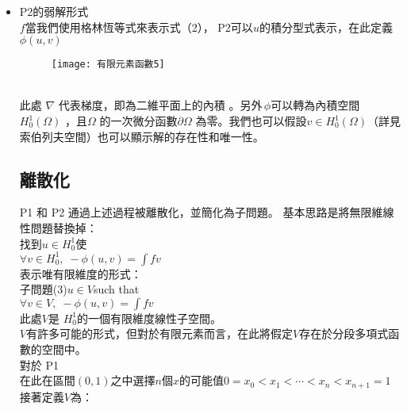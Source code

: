 \begin{itemize}
\item P2的弱解形式\\

\qquad $ f$當我們使用格林恆等式來表示式（2）， P2可以$ u$的積分型式表示，在此定義$ {\displaystyle \phi (u,v)} $\\
\begin{figure}[hbt!]
\begin{center}
\texttt{[image: 有限元素函數5]}
\end{center}
\end{figure}
\\

\qquad 此處 $ \nabla$ 代表梯度，即為二維平面上的內積 。另外$ {\displaystyle \,\!\phi }$可以轉為內積空間$ {\displaystyle H_{0}^{1}(\Omega )}$ ，且$ \Omega$ 的一次微分函數$ \partial \Omega$ 為零。我們也可以假設$ {\displaystyle v\in H_{0}^{1}(\Omega )}$（詳見索伯列夫空間）也可以顯示解的存在性和唯一性。\\ 

\subsection{離散化}

\qquad P1 和 P2 通過上述過程被離散化，並簡化為子問題。 基本思路是將無限維線性問題替換掉：\\

    找到$ {\displaystyle u\in H_{0}^{1}} $使\\
	
    $ {\displaystyle \forall v\in H_{0}^{1},\;-\phi (u,v)=\int fv}$\\

表示唯有限維度的形式：\\

    子問題(3)$ {\displaystyle u\in V} $such that\\
	
    $ {\displaystyle \forall v\in V,\;-\phi (u,v)=\int fv}$\\
	
\qquad 此處$ V $是 ${\displaystyle H_{0}^{1}}$的一個有限維度線性子空間。\\

\qquad $ V$有許多可能的形式，但對於有限元素而言，在此將假定$ V$存在於分段多項式函數的空間中。 \\

對於 P1\\

\qquad 在此在區間$ (0,1)$之中選擇$ n$個$ x$的可能值$ {\displaystyle 0=x_{0}<x_{1}<\cdots <x_{n}<x_{n+1}=1}$ 接著定義$ V $為：\\


\end{itemize}

